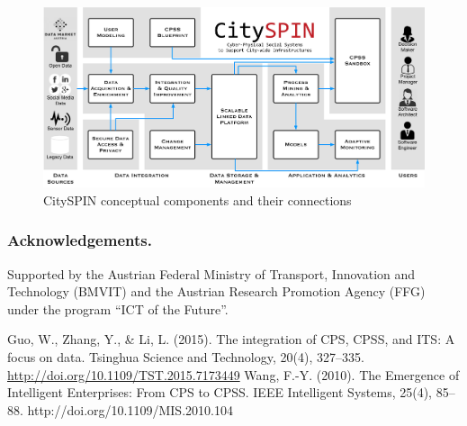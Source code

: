 \documentclass[runningheads,a4paper]{llncs}
\makeatletter
\def\maxwidth#1{\ifdim\Gin@nat@width>#1 #1\else\Gin@nat@width\fi}
\makeatother
\begin{document}
\begin{figure}[h!]
\centering
\includegraphics[width=\maxwidth{\textwidth}]{img/1000000000000FB40000076B2DAB8DA9.jpg}
\cprotect\caption{CitySPIN conceptual components and their connections}
\label{refIllustration0}
\end{figure}


\subsubsection*{Acknowledgements.}Supported by the Austrian Federal Ministry of Transport, Innovation and Technology (BMVIT) and the Austrian Research Promotion Agency (FFG) under the program ``ICT of the Future''.


\begin{thebibliography}{4}

 Guo, W., Zhang, Y., \& Li, L. (2015). The integration of CPS, CPSS, and ITS: A focus on data. Tsinghua Science and Technology, 20(4), 327--335. \url{http://doi.org/10.1109/TST.2015.7173449}
 Wang, F.-Y. (2010). The Emergence of Intelligent Enterprises: From CPS to CPSS. IEEE Intelligent Systems, 25(4), 85--88. http://doi.org/10.1109/MIS.2010.104

\end{thebibliography}
\end{document}
